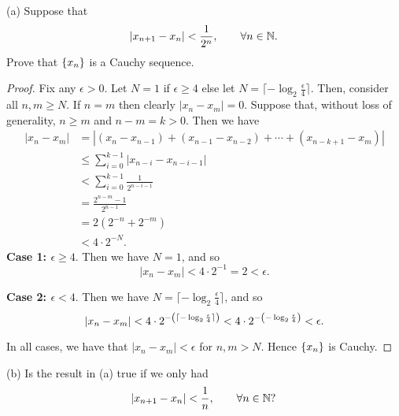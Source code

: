 \documentclass{article}
\newcommand{\N}{\mathbb{N}}
\begin{document}
(a) Suppose that
%
\begin{equation*}
    \envert{x_{n+1} - x_n} < \frac{1}{2^n}, \qquad \forall n \in \N
    .
\end{equation*}
%
Prove that $\cbr{x_n}$ is a Cauchy sequence.

\begin{proof}

Fix any $\epsilon > 0$. Let $N = 1$ if $\epsilon \geq 4$ else let $N =
\lceil - \log_2 \frac{\epsilon}{4} \rceil$. Then, consider all $n, m
\geq N$. If $n = m$ then clearly $|x_n - x_m| = 0$. Suppose that,
without loss of generality, $n \geq m$ and $n - m = k > 0$. Then we have
%
\begin{align*}
    |x_n - x_m|
        &= |(x_n - x_{n - 1}) + (x_{n - 1} - x_{n - 2}) + \cdots + (x_{n - k + 1} - x_m)| \\
        &\leq \sum_{i = 0}^{k - 1} |x_{n - i} - x_{n - i - 1}| \\
        &< \sum_{i = 0}^{k - 1} \frac{1}{2^{n - i - 1}} \\
        &= \frac{2^{n - m} - 1}{2^{n - 1}} \\
        &= 2 (2^{-n} + 2^{-m}) \\
        &< 4 \cdot 2^{-N}
        .
\end{align*}
%
\textbf{Case 1: $\epsilon \geq 4$}. Then we have $N = 1$, and so
%
\begin{equation*}
    |x_n - x_m| < 4 \cdot 2^{-1} = 2 < \epsilon
        .
\end{equation*}

\textbf{Case 2: $\epsilon < 4$}. Then we have $N = \lceil - \log_2
\frac{\epsilon}{4} \rceil$, and so
%
\begin{equation*}
    |x_n - x_m|
        < 4 \cdot 2^{- \del{\lceil - \log_2 \frac{\epsilon}{4} \rceil}}
        < 4 \cdot 2^{- \del{- \log_2 \frac{\epsilon}{4}}}
        < \epsilon
        .
\end{equation*}

In all cases, we have that $|x_n - x_m| < \epsilon$ for $n, m > N$.
Hence $\cbr{x_n}$ is Cauchy.

\end{proof}

\newpage

(b) Is the result in (a) true if we only had
%
\begin{equation*}
    \envert{x_{n+1} - x_n} < \frac{1}{n}, \qquad \forall n \in \N
    ?
\end{equation*}
\end{document}
